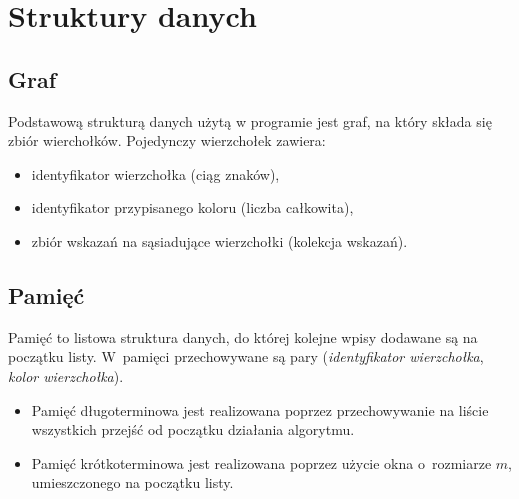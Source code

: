 \section{Struktury danych}
\subsection{Graf}
Podstawową strukturą danych użytą w programie jest graf, na który składa się zbiór wierchołków.
Pojedynczy wierzchołek zawiera:
\begin{itemize}
 \item identyfikator wierzchołka (ciąg znaków),
 \item identyfikator przypisanego koloru (liczba całkowita),
 \item zbiór wskazań na sąsiadujące wierzchołki (kolekcja wskazań).
\end{itemize}

\subsection{Pamięć}
Pamięć to listowa struktura danych, do której kolejne wpisy dodawane są na początku listy. W~pamięci przechowywane są pary (\emph{identyfikator wierzchołka}, \emph{kolor wierzchołka}).

\begin{itemize}
 \item Pamięć długoterminowa jest realizowana poprzez przechowywanie na liście wszystkich przejść od początku działania algorytmu.
 \item Pamięć krótkoterminowa jest realizowana poprzez użycie okna o~rozmiarze $m$, umieszczonego na początku listy.
\end{itemize}
